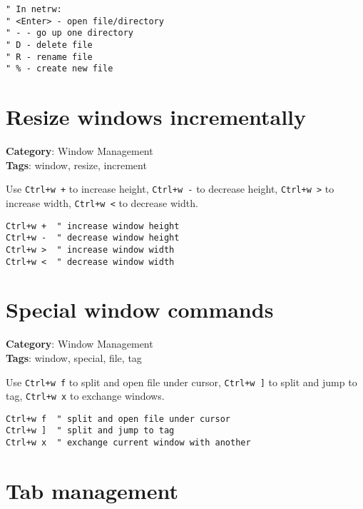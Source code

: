{{{{{{{{{{{{{{{{{{{\begin{Exa*}{}
\begin{Verbatim}[fontsize=\footnotesize, breaklines, breakanywhere]
" In netrw:
" <Enter> - open file/directory
" - - go up one directory
" D - delete file
" R - rename file
" % - create new file
\end{Verbatim}
\end{Exa*}

\section{Resize windows incrementally}

\textbf{Category}: Window Management\\ \textbf{Tags}: window, resize, increment
\vspace{0.5cm}

Use {\footnotesize \Verb§Ctrl+w +§} to increase height, {\footnotesize \Verb§Ctrl+w -§} to decrease height, {\footnotesize \Verb§Ctrl+w >§} to increase width, {\footnotesize \Verb§Ctrl+w <§} to decrease width.

\begin{Exa*}{}
\begin{Verbatim}[fontsize=\footnotesize, breaklines, breakanywhere]
Ctrl+w +  " increase window height
Ctrl+w -  " decrease window height
Ctrl+w >  " increase window width
Ctrl+w <  " decrease window width
\end{Verbatim}
\end{Exa*}

\section{Special window commands}

\textbf{Category}: Window Management\\ \textbf{Tags}: window, special, file, tag
\vspace{0.5cm}

Use {\footnotesize \Verb§Ctrl+w f§} to split and open file under cursor, {\footnotesize \Verb§Ctrl+w ]§} to split and jump to tag, {\footnotesize \Verb§Ctrl+w x§} to exchange windows.

\begin{Exa*}{}
\begin{Verbatim}[fontsize=\footnotesize, breaklines, breakanywhere]
Ctrl+w f  " split and open file under cursor
Ctrl+w ]  " split and jump to tag
Ctrl+w x  " exchange current window with another
\end{Verbatim}
\end{Exa*}

\section{Tab management}

}}}}}}}}}}}}}}}}}}}
